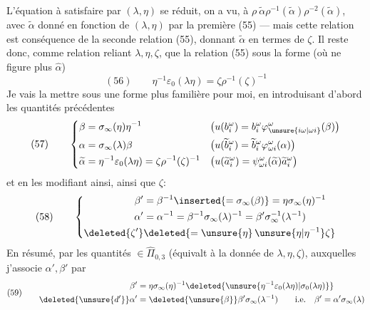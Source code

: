 L'équation à satisfaire par $(\lambda,\eta)$ se réduit, on a vu, à $\rho\ \widetilde\alpha\rho^{-1}(\widetilde\alpha)\rho^{-2}(\widetilde\alpha)$, avec $\widetilde\alpha$ donné en fonction de $(\lambda,\eta)$ par la première   (55) --- mais cette relation  est conséquence de la seconde relation (55), donnant $\widetilde\alpha$ en termes de $\zeta$. Il reste donc, comme relation reliant $\lambda,\eta,\zeta$, que la relation (55) sous la forme (où ne figure plus $\widehat\alpha$)
\[
(56)\qquad\eta^{-1}\varepsilon_0(\lambda\eta)=\zeta\rho^{-1}(\zeta)^{-1}
\]
Je vais la mettre sous une forme plus familière pour moi, en introduisant d'abord les quantités précédentes
\[
(57)\qquad\left\{\begin{aligned}
\beta&=\sigma_\infty(\eta)\eta^{-1}
&&\bigl(u(b_i^\omega)=b_i^\omega\varphi_{\unsure{i\omega|\omega i}}^\omega(\beta)\bigr)\\
\alpha&=\sigma_\infty(\lambda)\beta
&&\bigl(u(\widetilde b_i^\omega)=\widetilde b_i^\omega\varphi_{\omega i}^\omega(\alpha)\bigr)\\
\widetilde\alpha&=\eta^{-1}\varepsilon_0(\lambda\eta)=\zeta\rho^{-1}(\zeta)^{-1}
&&\bigl(u(\widetilde a_i^\omega)=\psi_{\omega i}^\omega(\widetilde\alpha)\widetilde a_i^\omega\bigr)
\end{aligned}\right.
\]
et en les modifiant ainsi, ainsi que $\zeta$:
\[
(58)\qquad\left\{\begin{aligned}
\beta'&=\beta^{-1}\inserted{=\sigma_\infty(\beta)}=\eta\sigma_\infty(\eta)^{-1}\\
\alpha'&=\alpha^{-1}=\beta^{-1}\sigma_\infty(\lambda)^{-1}=\beta'\sigma_\infty^{-1}(\lambda^{-1})\\
\deleted{\zeta'}&\deleted{=\unsure{\eta}\,\unsure{\eta|\eta^{-1}}\zeta}
\end{aligned}\right.
\]
En résumé,  par les quantités  $\in\widehat\Pi_{0,3}$ (équivalt à la donnée de $\lambda,\eta,\zeta$), auxquelles j'associe $\alpha',\beta'$ par
\[
(59)\qquad\begin{aligned}
\beta'&=\eta\sigma_\infty(\eta)^{-1}\deleted{\unsure{\eta^{-1}\varepsilon_0(\lambda\eta)|\sigma_0(\lambda\eta)}}\\
\deleted{\unsure{d'}}\alpha'&=\deleted{\unsure{\beta}}\beta'\sigma_\infty(\lambda^{-1})
\qquad\text{i.e.}\quad\beta'=\alpha'\sigma_\infty(\lambda)
\end{aligned}
\]

